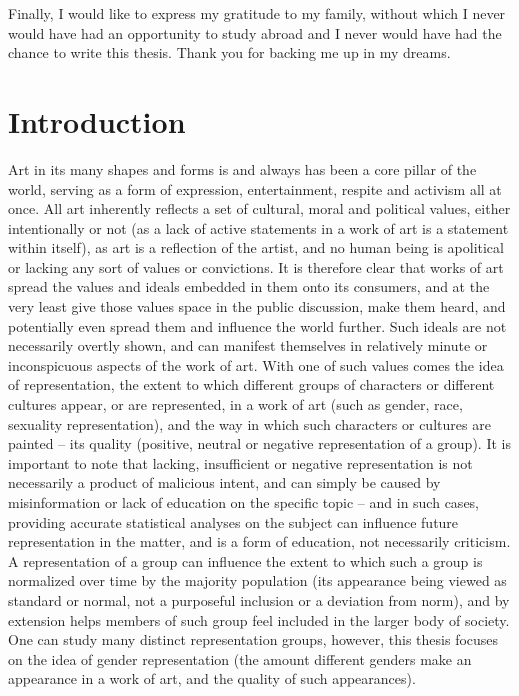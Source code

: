 \documentclass[a4paper, 11pt]{article}
\begin{document}
Finally, I would like to express my gratitude to my family, without which I never would have had an opportunity to study abroad and I never would have had the chance to write this thesis. Thank you for backing me up in my dreams.

\newpage
\tableofcontents
\listoftables
\listoffigures
\newpage


\section{Introduction}
Art in its many shapes and forms is and always has been a core pillar of the world, serving as a form of expression, entertainment, respite and activism all at once. All art inherently reflects a set of cultural, moral and political values, either intentionally or not (as a lack of active statements in a work of art is a statement within itself), as art is a reflection of the artist, and no human being is apolitical or lacking any sort of values or convictions. It is therefore clear that works of art spread the values and ideals embedded in them onto its consumers, and at the very least give those values space in the public discussion, make them heard, and potentially even spread them and influence the world further. Such ideals are not necessarily overtly shown, and can manifest themselves in relatively minute or inconspicuous aspects of the work of art. With one of such values comes the idea of representation, the extent to which different groups of characters or different cultures appear, or are represented, in a work of art (such as gender, race, sexuality representation), and the way in which such characters or cultures are painted -- its quality (positive, neutral or negative representation of a group). It is important to note that lacking, insufficient or negative representation is not necessarily a product of malicious intent, and can simply be caused by misinformation or lack of education on the specific topic -- and in such cases, providing accurate statistical analyses on the subject can influence future representation in the matter, and is a form of education, not necessarily criticism. A representation of a group can influence the extent to which such a group is normalized over time by the majority population (its appearance being viewed as standard or normal, not a purposeful inclusion or a deviation from norm), and by extension helps members of such group feel included in the larger body of society. One can study many distinct representation groups, however, this thesis focuses on the idea of gender representation (the amount different genders make an appearance in a work of art, and the quality of such appearances).
\end{document}
